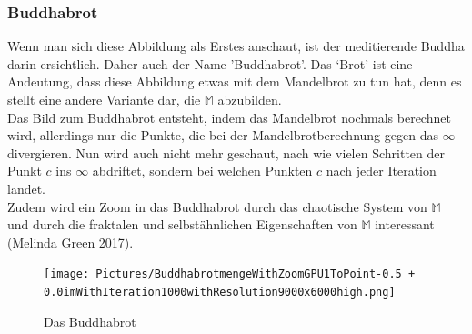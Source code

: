 \subsubsection{Buddhabrot}
Wenn man sich diese Abbildung als Erstes anschaut, ist der meditierende Buddha darin ersichtlich. Daher auch der Name ’Buddhabrot’. Das ‘Brot’ ist eine Andeutung, dass diese Abbildung etwas mit dem Mandelbrot zu tun hat, denn es stellt eine andere Variante dar, die $\mathbb{M}$ abzubilden.\\ 
Das Bild zum Buddhabrot entsteht, indem das Mandelbrot nochmals berechnet wird, allerdings nur die Punkte, die bei der Mandelbrotberechnung gegen das $\infty$ divergieren. Nun wird auch nicht mehr geschaut, nach wie vielen Schritten der Punkt $c$ ins $\infty$ abdriftet, sondern bei welchen Punkten $c$ nach jeder Iteration landet.\\
Zudem wird ein Zoom in das Buddhabrot durch das chaotische System von $\mathbb{M}$ und durch die fraktalen und selbstähnlichen Eigenschaften von $\mathbb{M}$ interessant (Melinda Green 2017).
\begin{figure}[h]
	\centering
	\texttt{[image: Pictures/BuddhabrotmengeWithZoomGPU1ToPoint-0.5 + 0.0imWithIteration1000withResolution9000x6000high.png]}
	\caption{Das Buddhabrot}
	\label{fig:Buddhabrot}
\end{figure}